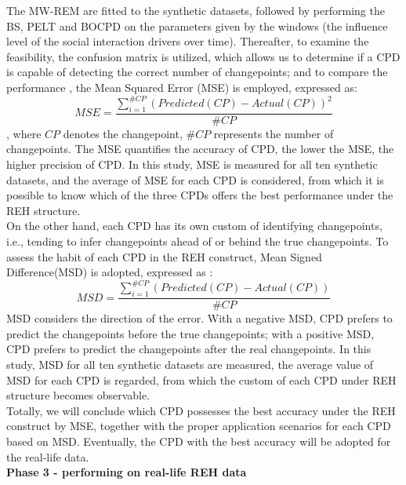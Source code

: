 \documentclass[]{interact}
\theoremstyle{plain}%
\theoremstyle{definition}
\theoremstyle{remark}
\begin{document}
The MW-REM are fitted to the synthetic datasets, followed by performing the BS, PELT and BOCPD on the parameters given by the windows (the influence level of the social interaction drivers over time). Thereafter, to examine the feasibility, the confusion matrix is utilized, which allows us to determine if a CPD is capable of detecting the correct number of changepoints; and to compare the performance \cite{aminikhanghahiSurveyMethodsTime2017}, the Mean Squared Error (MSE) is employed,  expressed as:
\begin{equation} \label{11}
	MSE = \frac{\sum_{i = 1}^{\#CP} (Predicted(CP) - Actual(CP))^2}{\#CP}
\end{equation}
, where $CP$ denotes the changepoint, $\#CP$ represents the number of changepoints. The MSE quantifies the accuracy of CPD, the lower the MSE, the higher precision of CPD. In this study, MSE is measured for all ten synthetic datasets, and the average of MSE for each CPD is considered, from which it is possible to know which of the three CPDs offers the best performance under the REH structure. \\

On the other hand, each CPD has its own custom of identifying changepoints, i.e., tending to infer changepoints ahead of or behind the true changepoints. To assess the habit of each CPD in the REH construct, Mean Signed Difference(MSD) is adopted, expressed as \cite{aminikhanghahiSurveyMethodsTime2017}:
\begin{equation} \label{12}
	MSD = \frac{\sum_{i = 1}^{\#CP} (Predicted(CP) - Actual(CP))}{\#CP}
\end{equation}
MSD considers the direction of the error. With a negative MSD, CPD prefers to predict the changepoints before the true changepoints; with a positive MSD, CPD prefers to predict the changepoints after the real changepoints. In this study, MSD for all ten synthetic datasets are measured, the average value of MSD for each CPD is regarded, from which the custom of each CPD under REH structure becomes observable. \\

Totally, we will conclude which CPD possesses the best accuracy under the REH construct by MSE, together with the proper application scenarios for each CPD based on MSD. Eventually, the CPD with the best accuracy will be adopted for the real-life data. \\

\hspace{-0.55cm} \textbf{Phase 3 - performing on real-life REH data}\\
\end{document}
